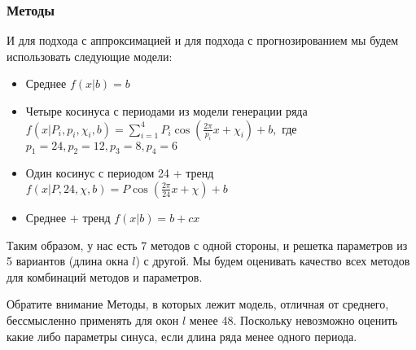 \documentclass[intlimits, 9pt, unicode]{beamer}
\begin{document}
\begin{frame}
\frametitle{Методы}

И для подхода с аппроксимацией и для подхода с прогнозированием мы будем использовать следующие модели:

\begin{itemize}
	\item Среднее $f(x | b) = b $
	\item Четыре косинуса с периодами из модели генерации ряда  $f(x | P_i, p_i, \chi_i, b) = \sum_{i=1}^4P_i\cos(\frac{2\pi}{p_i}x + \chi_i) + b, $ где $p_1 = 24, p_2 = 12, p_3 = 8, p_4 = 6$
	\item Один косинус с периодом 24 + тренд $f(x | P, 24, \chi, b) = P\cos(\frac{2\pi}{24}x + \chi) + b $
	\item Среднее + тренд $f(x | b) = b + cx $
\end{itemize}

Таким образом, у нас есть 7 методов с одной стороны, и решетка параметров из 5 вариантов (длина окна $l$) с другой. Мы будем оценивать качество всех методов для комбинаций методов и параметров.

 \begin{alertblock}{Обратите внимание}
Методы, в которых лежит модель, отличная от среднего, бессмысленно применять для окон $l$ менее 48. Поскольку невозможно оценить какие либо параметры синуса, если длина ряда менее одного периода.
\end{alertblock}



\end{frame}

%
%
\end{document}
